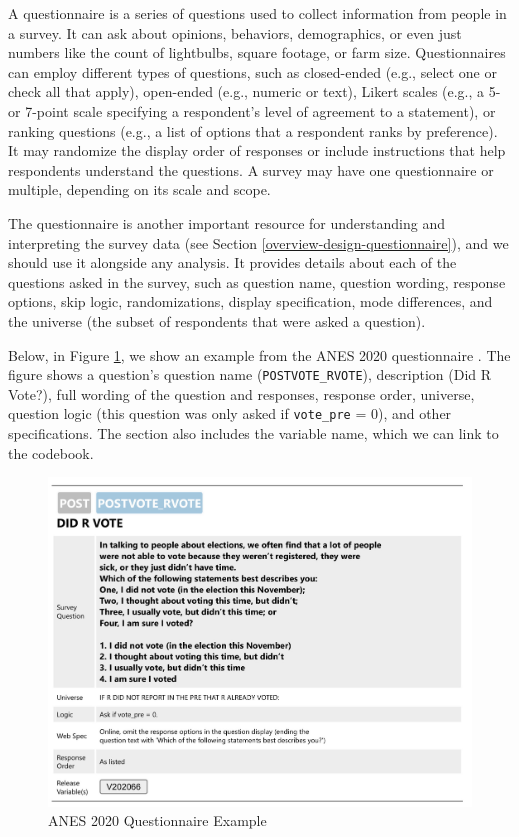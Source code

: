 \documentclass[
]{krantz}
\begin{document}
A questionnaire is a series of questions used to collect information from people in a survey. It can ask about opinions, behaviors, demographics, or even just numbers like the count of lightbulbs, square footage, or farm size. Questionnaires can employ different types of questions, such as closed-ended (e.g., select one or check all that apply), open-ended (e.g., numeric or text), Likert scales (e.g., a 5- or 7-point scale specifying a respondent's level of agreement to a statement), or ranking questions (e.g., a list of options that a respondent ranks by preference). It may randomize the display order of responses or include instructions that help respondents understand the questions. A survey may have one questionnaire or multiple, depending on its scale and scope.

The questionnaire is another important resource for understanding and interpreting the survey data (see Section \ref{overview-design-questionnaire}), and we should use it alongside any analysis. It provides details about each of the questions asked in the survey, such as question name, question wording, response options, skip logic, randomizations, display specification, mode differences, and the universe (the subset of respondents that were asked a question).

Below, in Figure \ref{fig:understand-que-examp}, we show an example from the ANES 2020 questionnaire \citep{anes-svy}. The figure shows a question's question name (\texttt{POSTVOTE\_RVOTE}), description (Did R Vote?), full wording of the question and responses, response order, universe, question logic (this question was only asked if \texttt{vote\_pre} = 0), and other specifications. The section also includes the variable name, which we can link to the codebook.

\begin{figure}
\includegraphics{images/questionnaire-example} \caption{ANES 2020 Questionnaire Example}\label{fig:understand-que-examp}
\end{figure}
\end{document}
